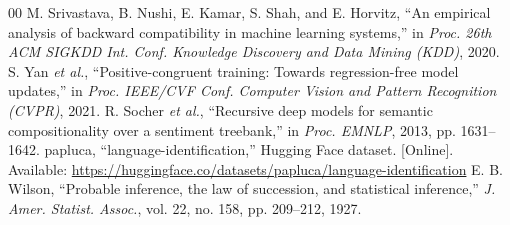 \documentclass[conference]{IEEEtran}
\begin{document}
\begin{thebibliography}{00}
 M. Srivastava, B. Nushi, E. Kamar, S. Shah, and E. Horvitz, ``An empirical analysis of backward compatibility in machine learning systems,'' in \textit{Proc. 26th ACM SIGKDD Int. Conf. Knowledge Discovery and Data Mining (KDD)}, 2020.
 S. Yan \textit{et al.}, ``Positive-congruent training: Towards regression-free model updates,'' in \textit{Proc. IEEE/CVF Conf. Computer Vision and Pattern Recognition (CVPR)}, 2021.
 R. Socher \textit{et al.}, ``Recursive deep models for semantic compositionality over a sentiment treebank,'' in \textit{Proc. EMNLP}, 2013, pp. 1631--1642.
 papluca, ``language-identification,'' Hugging Face dataset. [Online]. Available: \url{https://huggingface.co/datasets/papluca/language-identification}
 E. B. Wilson, ``Probable inference, the law of succession, and statistical inference,'' \textit{J. Amer. Statist. Assoc.}, vol. 22, no. 158, pp. 209--212, 1927.
\end{thebibliography}
\end{document}
